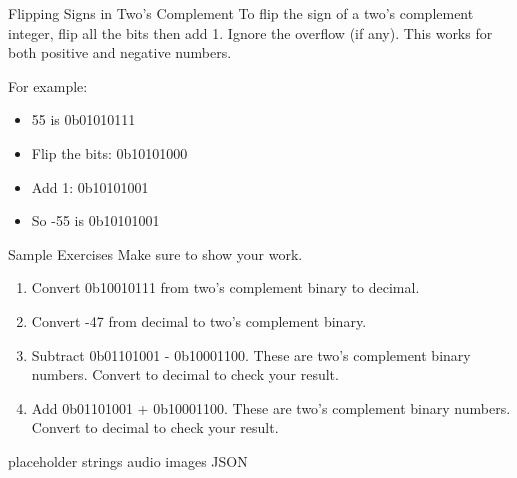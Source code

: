\begin{frame}{Flipping Signs in Two's Complement}
    To flip the sign of a two's complement integer, flip all the bits then add 1. Ignore the overflow (if any). This works for both positive and negative numbers.

    For example:
    \begin{itemize}
        \item 55 is 0b01010111
        \item Flip the bits: 0b10101000
        \item Add 1: 0b10101001
        \item So -55 is 0b10101001
    \end{itemize}
\end{frame}

\begin{frame}{Sample Exercises}
    Make sure to show your work.
    \begin{enumerate}
        \item Convert 0b10010111 from two's complement binary to decimal.
        \item Convert -47 from decimal to two's complement binary.
        \item Subtract 0b01101001 - 0b10001100. These are two's complement binary numbers.
              Convert to decimal to check your result.
        \item Add 0b01101001 + 0b10001100. These are two's complement binary numbers. Convert
              to decimal to check your result.
    \end{enumerate}
\end{frame}




\begin{frame}{placeholder}
    strings
    audio
    images
    JSON
\end{frame}


